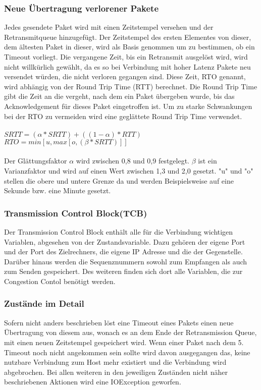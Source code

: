\subsubsection{Neue Übertragung verlorener Pakete}
Jedes gesendete Paket wird mit einen Zeitstempel versehen und der Retransmitqueue hinzugefügt. Der Zeitstempel des ersten Elementes von dieser, dem ältesten Paket in dieser, wird als Basis genommen um zu bestimmen, ob ein Timeout vorliegt. Die vergangene Zeit, bis ein Retransmit ausgelöst wird, wird nicht willkürlich gewählt, da es so bei Verbindung mit hoher Latenz Pakete neu versendet würden, die nicht verloren gegangen sind. Diese Zeit, RTO genannt, wird abhängig von der Round Trip Time (RTT) berechnet. Die Round Trip Time gibt die Zeit an die vergeht, nach dem ein Paket übergeben wurde, bis das Acknowledgement für dieses Paket eingetroffen ist.  Um zu starke Schwankungen bei der RTO zu vermeiden wird eine geglättete Round Trip Time verwendet. \\\\
$SRTT = (\alpha * SRTT) + ((1-\alpha)*RTT)$\\
$RTO = min [u, max [o, (\beta *SRTT)]]$\\\\
Der Glättungsfaktor $\alpha$ wird zwischen 0,8 und 0,9 festgelegt. $\beta$ ist ein Varianzfaktor und wird auf einen Wert zwischen 1,3 und 2,0 gesetzt. {}"u"{} und {}"o"{} stellen die obere und untere Grenze da und werden Beispielsweise auf eine Sekunde bzw. eine Minute gesetzt.


\subsubsection{Transmission Control Block(TCB)}

Der Transmission Control Block enthält alle für die Verbindung wichtigen Variablen, abgesehen von der Zustandsvariable.  Dazu gehören der eigene Port und der Port des Zielrechners, die eigene IP Adresse und die der Gegenstelle. Darüber hinaus werden die Sequenznummern sowohl zum Empfangen als auch zum Senden gespeichert.  Des weiteren finden sich dort alle Variablen, die zur Congestion Contol benötigt werden.  


\subsubsection{Zustände im Detail}
Sofern nicht anders beschrieben löst eine Timeout eines Pakets einen neue Übertragung von diesem aus, wonach es an dem Ende der Retransmission Queue, mit einen neuen Zeitstempel gespeichert wird. Wenn einer Paket nach dem 5. Timeout noch nicht angekommen sein sollte wird davon ausgegangen das, keine nutzbare Verbindung zum Host mehr existiert und die Verbindung wird abgebrochen. 
Bei allen weiteren in den jeweiligen Zuständen nicht näher beschriebenen Aktionen wird eine IOException geworfen.

